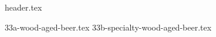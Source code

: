 \clearpage
{}
\divisorLine
{header.tex}
\begin{multicols*}{2}
{33a-wood-aged-beer.tex}
{33b-specialty-wood-aged-beer.tex}
\end{multicols*}
